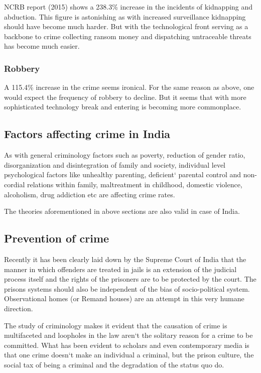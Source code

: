 \documentclass{article}
\begin{document}
NCRB report (2015) shows a 238.3\% increase in the incidents of kidnapping and abduction. This figure is astonishing as with increased surveillance kidnapping should have become much harder. But with the technological front serving as a backbone to crime collecting ransom money and dispatching untraceable threats has become much easier.

\subsubsection*{Robbery}

A 115.4\% increase in the crime seems ironical. For the same reason as above, one would expect the frequency of robbery to decline. But it seems that with more sophisticated technology break and entering is becoming more commonplace.

\subsection{Factors affecting crime in India}

As with general criminology factors such as poverty, reduction of gender ratio, disorganization and disintegration of family and society, individual level psychological factors like unhealthy parenting, deficient‘ parental control and non-cordial relations within family, maltreatment in childhood, domestic violence, alcoholism, drug addiction etc are affecting crime rates.

The theories aforementioned in above sections are also valid in case of India.

\subsection{Prevention of crime}

Recently it has been clearly laid down by the Supreme Court of India that the manner in which offenders are treated in jails is an extension of the judicial process itself and the rights of the prisoners are to be protected by the court. The prisons systems should also be independent of the bias of socio-political system.  Observational homes (or Remand houses) are an attempt in this very humane direction.

The study of criminology makes it evident that the causation of crime is multifaceted and loopholes in the law aren‘t the solitary reason for a crime to be committed. What has been evident to scholars and even contemporary media is that one crime doesn‘t make an individual a criminal, but the prison culture, the social tax of being a criminal and the degradation of the status quo do. 
\end{document}
